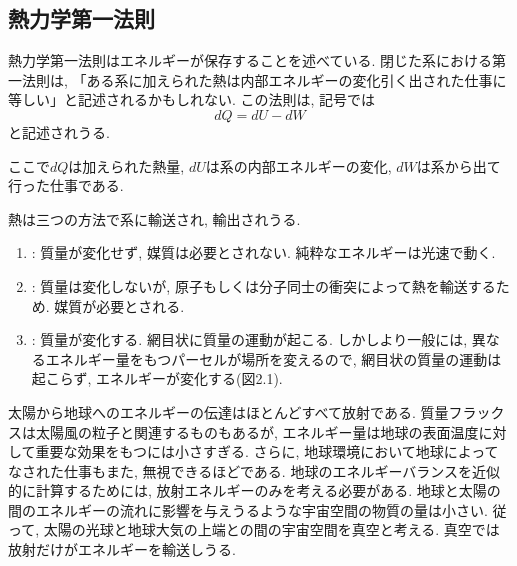 \documentclass[a4j,12pt,openbib,oneside,dvipdfmx]{jbook}
\begin{document}
\subsection{熱力学第一法則}
\par
熱力学第一法則はエネルギーが保存することを述べている. 閉じた系における第一法則は, 「ある系に加えられた熱は内部エネルギーの変化引く出された仕事に等しい」と記述されるかもしれない. この法則は, 記号では
\begin{equation}
  dQ=dU-dW
\end{equation}
と記述されうる.
\par
ここで$dQ$は加えられた熱量, $dU$は系の内部エネルギーの変化, $dW$は系から出て行った仕事である.
\par
熱は三つの方法で系に輸送され, 輸出されうる.
\begin{enumerate}
  \item{: 質量が変化せず, 媒質は必要とされない. 純粋なエネルギーは光速で動く.}
  \item{: 質量は変化しないが, 原子もしくは分子同士の衝突によって熱を輸送するため. 媒質が必要とされる.}
  \item{: 質量が変化する. 網目状に質量の運動が起こる. しかしより一般には, 異なるエネルギー量をもつパーセルが場所を変えるので, 網目状の質量の運動は起こらず, エネルギーが変化する(図2.1).}
\end{enumerate}
\par
太陽から地球へのエネルギーの伝達はほとんどすべて放射である. 質量フラックスは太陽風の粒子と関連するものもあるが, エネルギー量は地球の表面温度に対して重要な効果をもつには小さすぎる. 
さらに, 地球環境において地球によってなされた仕事もまた, 無視できるほどである. 地球のエネルギーバランスを近似的に計算するためには, 放射エネルギーのみを考える必要がある. 
地球と太陽の間のエネルギーの流れに影響を与えうるような宇宙空間の物質の量は小さい. 従って, 太陽の光球と地球大気の上端との間の宇宙空間を真空と考える. 
真空では放射だけがエネルギーを輸送しうる. 
\end{document}
